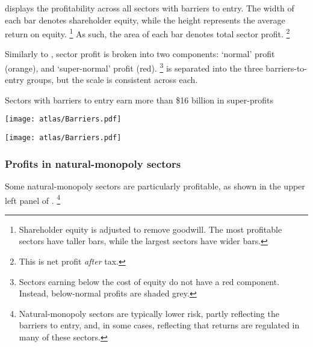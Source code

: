  displays the profitability across all sectors with barriers to entry.
The width of each bar denotes shareholder equity, while the height represents the average return on equity.%
    \footnote{Shareholder equity is adjusted to remove goodwill. The most profitable sectors have taller bars, while the largest sectors have wider bars.}
As such, the area of each bar denotes total sector profit.%
    \footnote{This is net profit \emph{after} tax.}

Similarly to , sector profit is broken into two components: `normal' profit (orange), and `super-normal' profit (red).%
    \footnote{Sectors earning below the cost of equity do not have a red component. Instead, below-normal profits are shaded grey.}
 is separated into the three barriers-to-entry groups, but the scale is consistent across each.

\begin{figureWhole}
\caption{Sectors with barriers to entry earn more than \$16 billion in super-profits\label{fig:ROE_barriers}}
 \vspace{2pt} 
\vspace{-2pt}
\texttt{[image: atlas/Barriers.pdf]}

\vspace{12pt}

\vspace{-77pt}
\texttt{[image: atlas/Barriers.pdf]}
\end{figureWhole}

\subsubsection{Profits in natural-monopoly sectors}

Some natural-monopoly sectors are particularly profitable, as shown in the upper left panel of .%
    \footnote{Natural-monopoly sectors are typically lower risk, partly reflecting the barriers to entry, and, in some cases, reflecting that returns are regulated in many of these sectors.}

